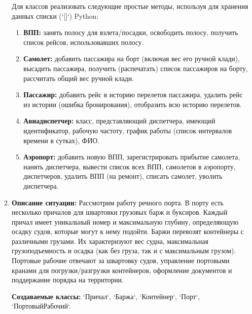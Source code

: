 \begin{enumerate}
Для классов реализовать следующие простые методы, используя для хранения данных списки (`[]`) Python:
\begin{enumerate}
    \item \textbf{ВПП:} занять полосу для взлета/посадки, освободить полосу, получить список рейсов, использовавших полосу.
    \item \textbf{Самолет:} добавить пассажира на борт (включая вес его ручной клади), высадить пассажира, получить (распечатать) список пассажиров на борту, рассчитать общий вес ручной клади.
    \item \textbf{Пассажир:} добавить рейс в историю перелетов пассажира, удалить рейс из истории (ошибка бронирования), отобразить всю историю перелетов.
    \item \textbf{Авиадиспетчер:} класс, представляющий диспетчера, имеющий идентификатор, рабочую частоту, график работы (список интервалов времени в сутках), ФИО.
    \item \textbf{Аэропорт:} добавить новую ВПП, зарегистрировать прибытие самолета, нанять диспетчера, вывести список всех ВПП, самолетов в аэропорту, диспетчеров, удалить ВПП (на ремонт), списать самолет, уволить диспетчера.
\end{enumerate}

\item
\textbf{Описание ситуации:}
Рассмотрим работу речного порта. В порту есть несколько причалов для швартовки грузовых барж и буксиров. Каждый причал имеет уникальный номер и максимальную глубину, определяющую осадку судов, которые могут к нему подойти. Баржи перевозят контейнеры с различными грузами. 
Их характеризуют вес судна, максимальная грузоподъемность и осадка (как без груза, так и с максимальным грузом). Портовые рабочие отвечают за швартовку судов, управление портовыми кранами для погрузки/разгрузки контейнеров, оформление документов и поддержание порядка на территории.

\textbf{Создаваемые классы:} `Причал`, `Баржа`, `Контейнер`, `Порт`, `ПортовыйРабочий`.


\end{enumerate}
